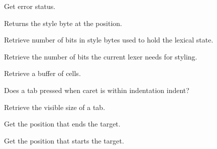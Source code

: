 Get error status.


\label{wxstyledtextctrlgetstyleat}


Returns the style byte at the position.


\label{wxstyledtextctrlgetstylebits}


Retrieve number of bits in style bytes used to hold the lexical state.


\label{wxstyledtextctrlgetstylebitsneeded}


Retrieve the number of bits the current lexer needs for styling.


\label{wxstyledtextctrlgetstyledtext}


Retrieve a buffer of cells.


\label{wxstyledtextctrlgettabindents}


Does a tab pressed when caret is within indentation indent?


\label{wxstyledtextctrlgettabwidth}


Retrieve the visible size of a tab.


\label{wxstyledtextctrlgettargetend}


Get the position that ends the target.


\label{wxstyledtextctrlgettargetstart}


Get the position that starts the target.


\label{wxstyledtextctrlgettext}


